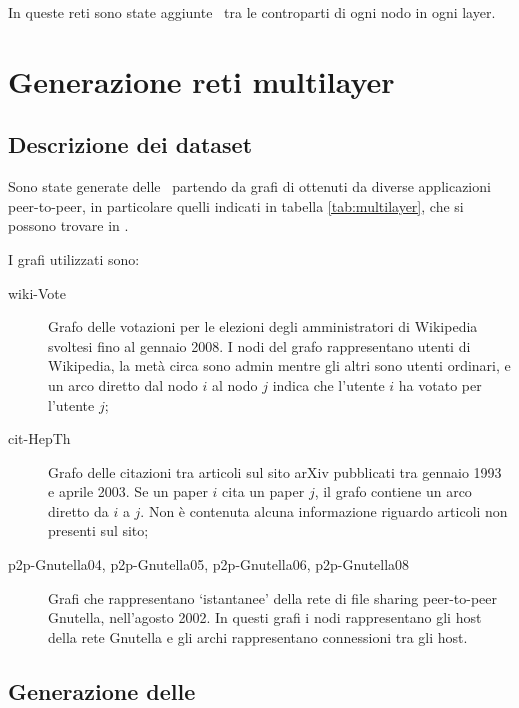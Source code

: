 In queste reti sono state aggiunte \interc\ tra le controparti di ogni nodo in ogni layer.



\section{Generazione reti multilayer}

\subsection{Descrizione dei dataset}
Sono state generate delle \muln\ partendo da grafi di ottenuti da 
diverse applicazioni peer-to-peer, in particolare quelli 
indicati in tabella \vref{tab:multilayer}, che si possono trovare in \cite{data:multilayer}.

I grafi utilizzati sono:
\begin{description}
    \item[wiki-Vote] Grafo delle votazioni per le elezioni degli amministratori 
    di Wikipedia svoltesi fino al gennaio 2008.
    I nodi del grafo rappresentano utenti di Wikipedia, la metà circa sono 
    admin mentre gli altri sono utenti ordinari, e un arco diretto dal nodo 
    $i$ al nodo $j$ indica che l'utente $i$ ha votato per l'utente $j$;

    \item[cit-HepTh] Grafo delle citazioni tra articoli sul sito arXiv
    pubblicati tra gennaio 1993 e aprile 2003.
    Se un paper $i$ cita un paper $j$, il grafo contiene un arco diretto 
    da $i$ a $j$. Non è contenuta alcuna informazione riguardo articoli non 
    presenti sul sito;

    \item[p2p-Gnutella04\textnormal{,} p2p-Gnutella05\textnormal{,} p2p-Gnutella06\textnormal{,} p2p-Gnutella08] 
    Grafi che rappresentano `istantanee' della rete di file sharing peer-to-peer Gnutella, nell'agosto 2002.
    In questi grafi i nodi rappresentano gli host della rete Gnutella e gli archi 
    rappresentano connessioni tra gli host.

\end{description}




\subsection{Generazione delle \mulns}

